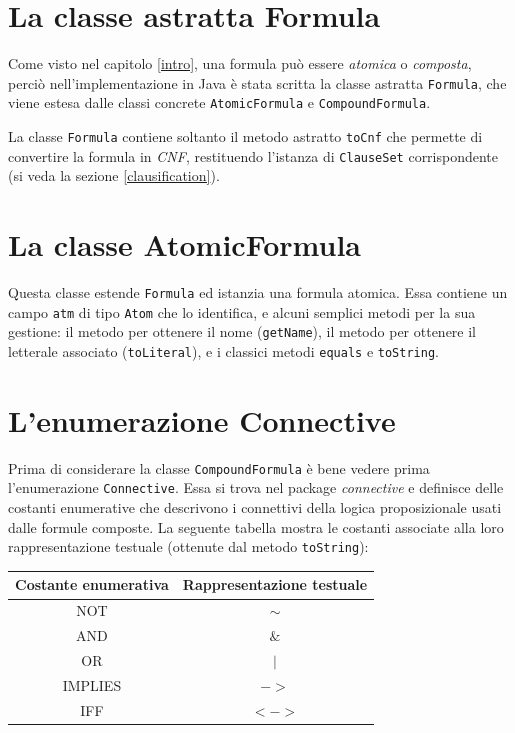 \documentclass[a4paper,12pt]{report}
\begin{document}
\section{La classe astratta Formula}
Come visto nel capitolo \ref{intro}, una formula può essere \emph{atomica} o \emph{composta}, perciò nell'implementazione in Java è stata scritta la classe astratta \texttt{Formula}, che viene estesa dalle classi concrete \texttt{AtomicFormula} e \texttt{CompoundFormula}.

La classe \texttt{Formula} contiene soltanto il metodo astratto \texttt{toCnf} che permette di convertire la formula in \emph{CNF}, restituendo l'istanza di \texttt{ClauseSet} corrispondente (si veda la sezione \ref{clausification}).

\section{La classe AtomicFormula}
\label{AtomicFormula}
Questa classe estende \texttt{Formula} ed istanzia una formula atomica. Essa contiene un campo \texttt{atm} di tipo \texttt{Atom} che lo identifica, e alcuni semplici metodi per la sua gestione: il metodo per ottenere il nome (\texttt{getName}), il metodo per ottenere il letterale associato (\texttt{toLiteral}), e i classici metodi \texttt{equals} e \texttt{toString}.

\section{L'enumerazione Connective}
Prima di considerare la classe \texttt{CompoundFormula} è bene vedere prima l'enumerazione \texttt{Connective}. Essa si trova nel package \emph{connective} e definisce delle costanti enumerative che descrivono i connettivi della logica proposizionale usati dalle formule composte. La seguente tabella mostra le costanti associate alla loro rappresentazione testuale (ottenute dal metodo \texttt{toString}):
\begin{table}[H]
    \centering
    \begin{tabular}{|c||c|}
        \hline
        \textbf{Costante enumerativa} & \textbf{Rappresentazione testuale} \\
        \hline\hline
        NOT & $\sim$ \\
        \hline
        AND & $\&$ \\
        \hline
        OR & $|$ \\
        \hline
        IMPLIES & $->$ \\
        \hline
        IFF & $<->$ \\
        \hline
    \end{tabular}
\end{table}
\end{document}
